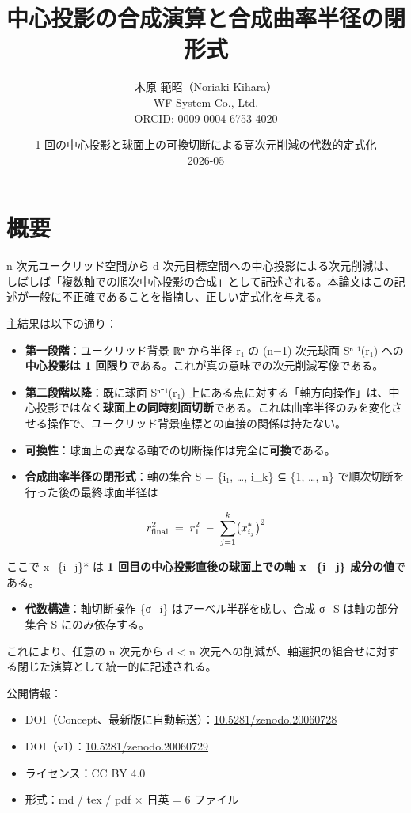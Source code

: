 \documentclass[a4paper,11pt]{ltjsarticle}
\title{中心投影の合成演算と合成曲率半径の閉形式}
\date{1
回の中心投影と球面上の可換切断による高次元削減の代数的定式化 \\[1ex] 2026-05}
\author{木原 範昭（Noriaki Kihara） \\ \small WF System Co.,
Ltd. \\ \small ORCID: 0009-0004-6753-4020}
\theoremstyle{definition}
\theoremstyle{remark}
\providecommand{\tightlist}{%
  \setlength{\itemsep}{0pt}\setlength{\parskip}{0pt}}
\begin{document}
\maketitle

\section{概要}\label{ux6982ux8981}

n 次元ユークリッド空間から d
次元目標空間への中心投影による次元削減は、しばしば「複数軸での順次中心投影の合成」として記述される。本論文はこの記述が一般に不正確であることを指摘し、正しい定式化を与える。

主結果は以下の通り：

\begin{itemize}
\tightlist
\item
  \textbf{第一段階}：ユークリッド背景 ℝⁿ から半径 r₁ の (n−1) 次元球面
  Sⁿ⁻¹(r₁) への\textbf{中心投影は 1
  回限り}である。これが真の意味での次元削減写像である。
\item
  \textbf{第二段階以降}：既に球面 Sⁿ⁻¹(r₁)
  上にある点に対する「軸方向操作」は、中心投影ではなく\textbf{球面上の同時刻面切断}である。これは曲率半径のみを変化させる操作で、ユークリッド背景座標との直接の関係は持たない。
\item
  \textbf{可換性}：球面上の異なる軸での切断操作は完全に\textbf{可換}である。
\item
  \textbf{合成曲率半径の閉形式}：軸の集合 S = \{i₁, \ldots, i\_k\} ⊆
  \{1, \ldots, n\} で順次切断を行った後の最終球面半径は
\end{itemize}

\[
r_{\rm final}^{2} \;=\; r_{1}^{2} \;-\; \sum_{j=1}^{k}\bigl(x_{i_j}^{*}\bigr)^{2}
\]

ここで x\_\{i\_j\}* は \textbf{1 回目の中心投影直後の球面上での軸
x\_\{i\_j\} 成分の値}である。

\begin{itemize}
\tightlist
\item
  \textbf{代数構造}：軸切断操作 \{σ\_i\} はアーベル半群を成し、合成 σ\_S
  は軸の部分集合 S にのみ依存する。
\end{itemize}

これにより、任意の n 次元から d \textless{} n
次元への削減が、軸選択の組合せに対する閉じた演算として統一的に記述される。

公開情報：

\begin{itemize}
\tightlist
\item
  DOI（Concept、最新版に自動転送）：\href{https://doi.org/10.5281/zenodo.20060728}{10.5281/zenodo.20060728}
\item
  DOI（v1）：\href{https://doi.org/10.5281/zenodo.20060729}{10.5281/zenodo.20060729}
\item
  ライセンス：CC BY 4.0
\item
  形式：md / tex / pdf × 日英 = 6 ファイル
\end{itemize}
\end{document}
